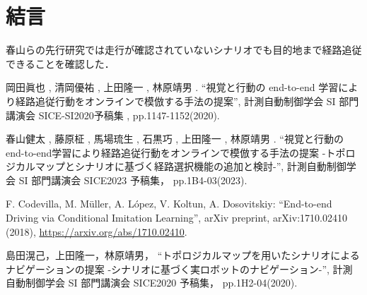 \documentclass[10pt]{jarticle}
\begin{document}
    \section{結\hspace{2zw}言}%
    春山らの先行研究では走行が確認されていないシナリオでも目的地まで経路追従できることを確認した．

    \vspace{5truemm}
    {\footnotesize
        \begin{thebibliography}{99}
            
            岡田眞也 , 清岡優祐 , 上田隆一 , 林原靖男 .
            ``視覚と行動の end-to-end 学習により経路追従行動をオンラインで模倣する手法の提案'',
            計測自動制御学会 SI 部門講演会 SICE-SI2020予稿集 , 
            pp.1147-1152(2020).

            春山健太 , 藤原柾 , 馬場琉生 , 石黒巧 , 上田隆一 , 林原靖男 .
            ``視覚と行動のend-to-end学習により経路追従行動をオンラインで模倣する手法の提案 -トポロジカルマップとシナリオに基づく経路選択機能の追加と検討-'',
            計測自動制御学会 SI 部門講演会 SICE2023 予稿集，
            pp.1B4-03(2023).
       
            F. Codevilla, M. Müller, A. López, V. Koltun, A. Dosovitskiy: 
            ``End-to-end Driving via Conditional Imitation Learning'', 
            arXiv preprint, arXiv:1710.02410 (2018), 
            \url{https://arxiv.org/abs/1710.02410}.

            島田滉己，上田隆一，林原靖男，
            ``トポロジカルマップを用いたシナリオによるナビゲーションの提案 -シナリオに基づく実ロボットのナビゲーション-'',
            計測自動制御学会 SI 部門講演会 SICE2020 予稿集，
            pp.1H2-04(2020).



        \end{thebibliography}
    }
    \normalsize
    
\end{document}
